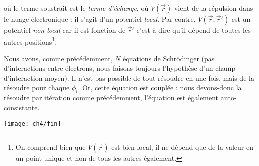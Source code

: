 où le terme soustrait est le \textit{terme d'échange}, où $V(\vec{r})$ vient de la répulsion dans le nuage 
électronique : il s'agit d'un potentiel \textit{local}. Par contre, $V(\vec{r},\vec{r}')$ est un potentiel \textit{non-local} car il est fonction de $\vec{r}'$ c'est-à-dire qu'il dépend de toutes les autres positions\footnote{On comprend bien que $V(\vec{r})$ est bien local, il ne dépend que de la valeur en un 
point unique et non de tous les autres également.}.

Nous avons, comme précédemment, $N$ équations de Schrödinger (pas d'interactions entre électrons, nous faisons 
toujours l'hypothèse d'un champ d'interaction moyen). Il n'est pas possible de tout résoudre en une fois, mais 
de la résoudre pour chaque $\phi_i$. Or, cette équation est couplée : nous devons-donc la résoudre par itération 
comme précédemment, l'équation est également auto-consistante.

	\vspace{1cm}
	\begin{center}
	\texttt{[image: ch4/fin]}
	\end{center}				